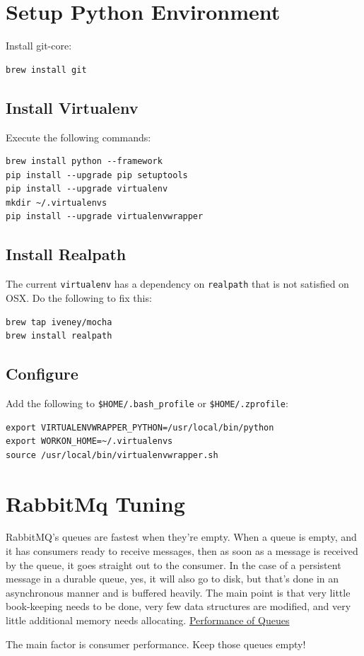 \documentclass[captions=tableheading]{scrreprt}
\begin{document}
\section{Setup Python Environment}
\label{sec:orgheadline19}
Install git-core:

\begin{verbatim}
brew install git
\end{verbatim}

\subsection{Install Virtualenv}
\label{sec:orgheadline27}
Execute the following commands:

\begin{verbatim}
brew install python --framework
pip install --upgrade pip setuptools
pip install --upgrade virtualenv
mkdir ~/.virtualenvs
pip install --upgrade virtualenvwrapper
\end{verbatim}

\subsection{Install Realpath}
\label{sec:orgheadline28}
The current \texttt{virtualenv} has a dependency on \texttt{realpath} that is not
satisfied on OSX. Do the following to fix this:

\begin{verbatim}
brew tap iveney/mocha
brew install realpath
\end{verbatim}

\subsection{Configure}
\label{sec:orgheadline29}
Add the following to \texttt{\$HOME/.bash\_profile} or \texttt{\$HOME/.zprofile}:

\begin{verbatim}
export VIRTUALENVWRAPPER_PYTHON=/usr/local/bin/python
export WORKON_HOME=~/.virtualenvs
source /usr/local/bin/virtualenvwrapper.sh
\end{verbatim}


\section{RabbitMq Tuning}
\label{sec:orgheadline30}
RabbitMQ's queues are fastest when they're empty. When a queue is
empty, and it has consumers ready to receive messages, then as soon as
a message is received by the queue, it goes straight out to the
consumer. In the case of a persistent message in a durable queue, yes,
it will also go to disk, but that's done in an asynchronous manner and
is buffered heavily. The main point is that very little book-keeping
needs to be done, very few data structures are modified, and very
little additional memory needs allocating. \href{http://www.rabbitmq.com/blog/2011/10/27/performance-of-queues-when-less-is-more/}{Performance of Queues}

The main factor is consumer performance. Keep those queues empty!
\end{document}
